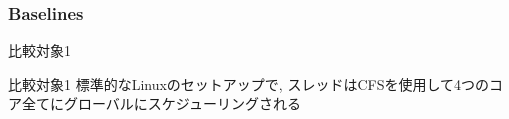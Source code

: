 


\subsubsection{Baselines}
\label{sssec: baselines}

\begin{frame}{比較対象1}
    \begin{block}{比較対象1}
        標準的なLinuxのセットアップで, スレッドはCFSを使用して4つのコア全てにグローバルにスケジューリングされる
    \end{block}
\end{frame}

